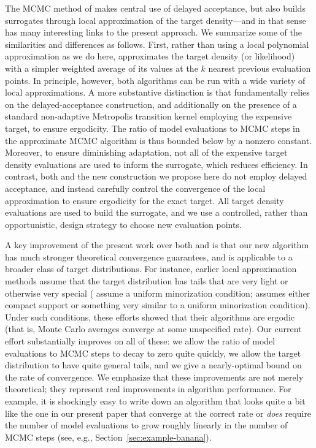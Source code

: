 {The MCMC method of \citet{doi:10.1080/10618600.2016.1231064} makes central use of delayed acceptance, but also builds surrogates through local approximation of the target density---and in that sense has many interesting links to the present approach. We summarize some of the similarities and differences as follows. First, rather than using a local polynomial approximation as we do here, \citet{doi:10.1080/10618600.2016.1231064} approximates the target density (or likelihood) with a simpler weighted average of its values at the $k$ nearest previous evaluation points. In principle, however, both algorithms can be run with a wide variety of local approximations. A more substantive distinction is that \citet{doi:10.1080/10618600.2016.1231064} fundamentally relies on the delayed-acceptance construction, and additionally on the presence of a standard non-adaptive Metropolis transition kernel employing the expensive target, to ensure ergodicity. 
%
The ratio of model evaluations to MCMC steps in the approximate MCMC algorithm is thus bounded below by a nonzero constant.
%
Moreover, to ensure diminishing adaptation, not all of the expensive target density evaluations are used to inform the surrogate, which reduces efficiency. 
%
In contrast, both \citet{Conradetal2016,Conradetal2018} and the new construction we propose here do not employ delayed acceptance, and instead carefully control the convergence of the local approximation to ensure ergodicity for the exact target.
%
All target density evaluations are used to build the surrogate, and we use a controlled, rather than opportunistic, design strategy to choose new evaluation points. 

A key improvement of the present work over both \citet{doi:10.1080/10618600.2016.1231064} and \citet{Conradetal2016,Conradetal2018} is that our new algorithm has much stronger theoretical convergence guarantees, and is applicable to a broader class of target distributions. For instance, earlier local approximation methods assume that the target distribution has tails that are very light or otherwise very special (\citet{doi:10.1080/10618600.2016.1231064} assume a uniform minorization condition; \citet{Conradetal2016} assumes either compact support or something very similar to a uniform minorization condition). Under such conditions, these efforts showed that their algorithms are ergodic (that is, Monte Carlo averages converge at some unspecified rate).
%
Our current effort substantially improves on all of these: we allow the ratio of model evaluations to MCMC steps to decay to zero quite quickly, we allow the target distribution to have quite general tails, and we give a nearly-optimal bound on the rate of convergence. We emphasize that these improvements are not merely theoretical; they represent real improvements in algorithm performance. For example, it is shockingly easy to write down an algorithm that looks quite a bit like the one in our present paper that  converge at the correct rate or \textit{does} require the number of model evaluations to grow roughly linearly in the number of MCMC steps (see, e.g., Section~\ref{sec:example-banana}).

}
